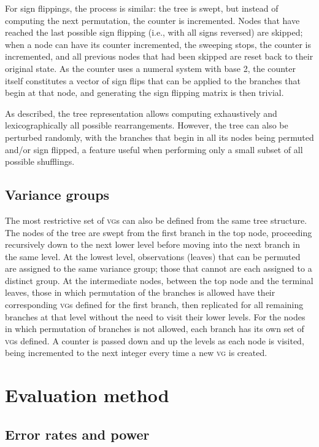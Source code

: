 For sign flippings, the process is similar: the tree is swept, but instead of computing the next permutation, the counter is incremented. Nodes that have reached the last possible sign flipping (i.e., with all signs reversed) are skipped; when a node can have its counter incremented, the sweeping stops, the counter is incremented, and all previous nodes that had been skipped are reset back to their original state. As the counter uses a numeral system with base 2, the counter itself constitutes a vector of sign flips that can be applied to the branches that begin at that node, and generating the sign flipping matrix is then trivial.

As described, the tree representation allows computing exhaustively and lexicographically all possible rearrangements. However, the tree can also be perturbed randomly, with the branches that begin in all its nodes being permuted and/or sign flipped, a feature useful when performing only a small subset of all possible shufflings.

\subsection{Variance groups}

The most restrictive set of \textsc{vg}s can also be defined from the same tree structure. The nodes of the tree are swept from the first branch in the top node, proceeding recursively down to the next lower level before moving into the next branch in the same level. At the lowest level, observations (leaves) that can be permuted are assigned to the same variance group; those that cannot are each assigned to a distinct group. At the intermediate nodes, between the top node and the terminal leaves, those in which permutation of the branches is allowed have their corresponding \textsc{vg}s defined for the first branch, then replicated for all remaining branches at that level without the need to visit their lower levels. For the nodes in which permutation of branches is not allowed, each branch has its own set of \textsc{vg}s defined. A counter is passed down and up the levels as each node is visited, being incremented to the next integer every time a new \textsc{vg} is created.

\section{Evaluation method}
\label{sec:ptree:evaluation}

\subsection{Error rates and power}


